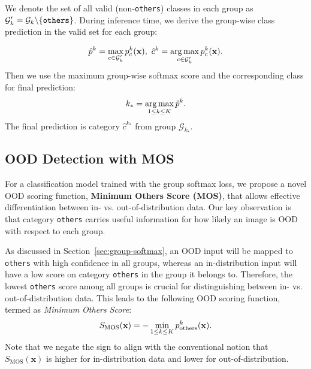 \documentclass[final]{cvpr}
\DeclareMathOperator*{\argmax}{arg\,max}
\def\*#1{\mathbf{#1}}
\begin{document}
 We denote the set of all valid (non-\texttt{others}) classes in each group as $\mathcal{G}'_k = \mathcal{G}_k \backslash \{\text{\texttt{others}}\}$. During inference time, we derive the group-wise class prediction in the valid set for each group:

\vspace{-0.2cm}
\begin{equation*}
    \hat p^k = \max_{c \in \mathcal{G}'_k} p_c^k(\mathbf{x}),\ \hat c^k = \argmax_{c \in \mathcal{G}'_k} p_c^k(\mathbf{x}).
    \vspace{-0.1cm}
\end{equation*}
Then we use the maximum group-wise softmax score and the corresponding class for final prediction:
\vspace{-0.2cm}
\begin{equation*}
    k_* = \argmax_{1 \leq k \leq K} \hat p^k.
\vspace{-0.1cm}
\end{equation*}
The final prediction is category $\hat c^{k_*}$ from group $\mathcal{G}_{k_*}$.






\subsection{OOD Detection with MOS}
\label{sec:gs-ood}
For a classification model trained with the group softmax loss, we propose a novel OOD scoring function, \textbf{Minimum Others Score (MOS)}, that allows effective differentiation between in- vs. out-of-distribution data. Our key observation is that category \texttt{others} carries useful information for how likely an image is OOD with respect to each group. 

As discussed in Section~\ref{sec:group-softmax}, an OOD input will be mapped to \texttt{others} with high confidence in all groups, whereas an in-distribution input will have a low score on category \texttt{others} in the group it belongs to. Therefore, the lowest \texttt{others} score among all groups is crucial for distinguishing between in- vs. out-of-distribution data. This leads to the following OOD scoring function, termed as \emph{Minimum Others Score}:
\vspace{-0.2cm}
\begin{equation}
    S_\text{MOS}(\mathbf{x}) = -\min_{1 \leq k \leq K}{p_{\text{others}}^k(\mathbf{x})}.
\vspace{-0.1cm}
\end{equation}
Note that we negate the sign to align with the conventional notion that $S_\text{MOS}(\*x)$ is higher for in-distribution data and lower for out-of-distribution.
\end{document}
